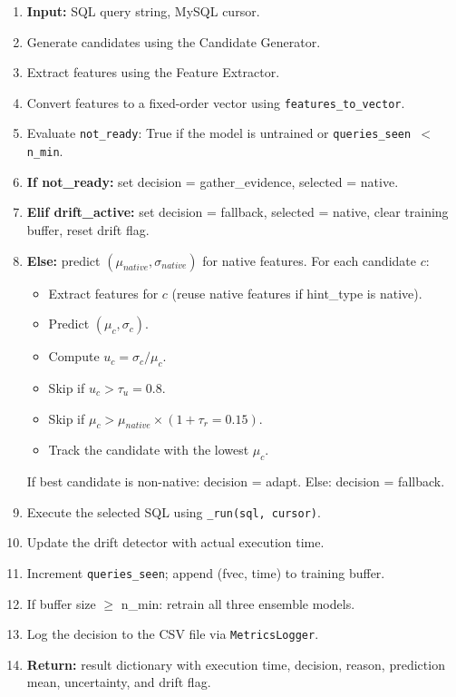 \begin{enumerate}
  \item \textbf{Input:} SQL query string, MySQL cursor.
  \item Generate candidates using the Candidate Generator.
  \item Extract features using the Feature Extractor.
  \item Convert features to a fixed-order vector using \texttt{features\_to\_vector}.
  \item Evaluate \texttt{not\_ready}: True if the model is untrained or
        \texttt{queries\_seen $<$ n\_min}.
  \item \textbf{If not\_ready:} set decision = gather\_evidence, selected = native.
  \item \textbf{Elif drift\_active:} set decision = fallback, selected = native,
        clear training buffer, reset drift flag.
  \item \textbf{Else:} predict $(\mu_{native}, \sigma_{native})$ for native features.
        For each candidate $c$:
        \begin{itemize}
          \item Extract features for $c$ (reuse native features if hint\_type is native).
          \item Predict $(\mu_c, \sigma_c)$.
          \item Compute $u_c = \sigma_c / \mu_c$.
          \item Skip if $u_c > \tau_u = 0.8$.
          \item Skip if $\mu_c > \mu_{native} \times (1 + \tau_r = 0.15)$.
          \item Track the candidate with the lowest $\mu_c$.
        \end{itemize}
        If best candidate is non-native: decision = adapt.
        Else: decision = fallback.
  \item Execute the selected SQL using \texttt{\_run(sql, cursor)}.
  \item Update the drift detector with actual execution time.
  \item Increment \texttt{queries\_seen}; append (fvec, time) to training buffer.
  \item If buffer size $\geq$ n\_min: retrain all three ensemble models.
  \item Log the decision to the CSV file via \texttt{MetricsLogger}.
  \item \textbf{Return:} result dictionary with execution time, decision, reason,
        prediction mean, uncertainty, and drift flag.
\end{enumerate}

